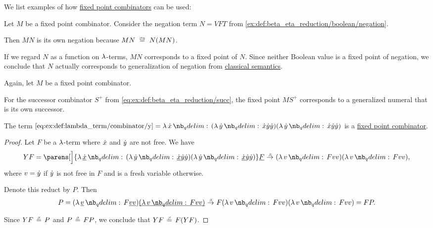 \begin{example}\label{ex:def:fixed_point_combinator}
  We list examples of how \hyperref[def:fixed_point_combinator]{fixed point combinators} can be used:
  \begin{thmenum}
     Let \( M \) be a fixed point combinator. Consider the negation term \( N = VFT \) from \eqref{ex:def:beta_eta_reduction/boolean/negation}.

    Then \( MN \) is its own negation because \( MN \beequiv N(MN) \).

    If we regard \( N \) as a function on \( \mathrm{\lambda} \)-terms, \( MN \) corresponds to a fixed point of \( N \). Since neither Boolean value is a fixed point of negation, we conclude that \( N \) actually corresponds to generalization of negation from \hyperref[def:classical_semantics]{classical semantics}.

     Again, let \( M \) be a fixed point combinator.

    For the successor combinator \( S^+ \) from \eqref{eq:ex:def:beta_eta_reduction/succ}, the fixed point \( MS^+ \) corresponds to a generalized numeral that is its own successor.
  \end{thmenum}
\end{example}

\begin{proposition}\label{thm:y_is_a_fixed_point_combinator}
  The term \( \ref{eq:ex:def:lambda_term/combinator/y} = \qabs \synx (\qabs \syny \synx \syny \syny) (\qabs \syny \synx \syny \syny) \) is a \hyperref[def:fixed_point_combinator]{fixed point combinator}.
\end{proposition}
\begin{proof}
  Let \( F \) be a \( \mathrm{\lambda} \)-term where \( {\dot{x}} \) and \( {\dot{y}} \) are not free. We have
  \begin{equation*}
    YF
    =
    \parens[\Big]{ \qabs {\hi{\synx}} (\qabs \syny \hi{\synx} \syny \syny) (\qabs \syny \hi{\synx} \syny \syny) } \hi{F}
    \bred
    (\qabs v F v v) (\qabs v F v v),
  \end{equation*}
  where \( v = {\dot{y}} \) if \( {\dot{y}} \) is not free in \( F \) and is a fresh variable otherwise.

  Denote this reduct by \( P \). Then
  \begin{equation*}
    P =
    (\qabs {\hi{v}} F \hi{v} \hi{v}) \hi{(\qabs v F v v)}
    \bred
    F (\qabs v F v v) (\qabs v F v v)
    =
    FP.
  \end{equation*}

  Since \( YF \bequiv P \) and \( P \bequiv FP \), we conclude that \( YF \bequiv F(YF) \).
\end{proof}

